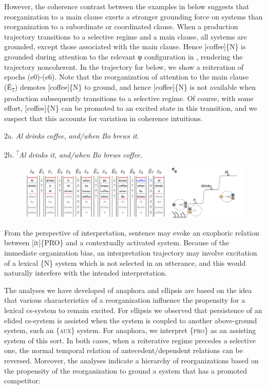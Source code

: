   However, the coherence contrast between the examples in  below suggests that reorganization to a main clause exerts a stronger grounding force on systems than reorganization to a subordinate or coordinated clause. When a production trajectory transitions to a selective regime and a main clause, all systems are grounded, except those associated with the main clause. Hence [coffee]\{N\} is grounded during attention to the relevant φ configuration in , rendering the trajectory noncoherent. In the trajectory for  below, we show a reiteration of epochs (e0)-(e6). Note that the reorganization of attention to the main clause (Ê\textsubscript{7}) demotes [coffee]\{N\} to ground, and hence [coffee]\{N\} is not available when production subsequently transitions to a selective regime. Of course, with some effort, [coffee]\{N\} can be promoted to an excited state in this transition, and we suspect that this accounts for variation in coherence intuitions. 

  2a.  \textit{Al} \textit{drinks} \textit{coffee,} \textit{and/when} \textit{Bo} \textit{brews} \textit{it.}  

  2b.  \textsuperscript{?}\textit{Al} \textit{drinks} \textit{it,} \textit{and/when} \textit{Bo} \textit{brews} \textit{coffee.}

  
\begin{figure}
\includegraphics[width=\textwidth]{figures/Tilsen-img155.png}
\caption{\missingcaption}
\label{fig:}
\end{figure}
 

  From the perspective of interpretation, sentence  may evoke an exophoric relation between [it]\{PRO\} and a contextually activated system. Because of the immediate organization bias, an interpretation trajectory may involve excitation of a lexical \{N\} system which is not selected in an utterance, and this would naturally interfere with the intended interpretation. 

  The analyses we have developed of anaphora and ellipsis are based on the idea that various characteristics of a reorganization influence the propensity for a lexical cs-system to remain excited. For ellipsis we observed that persistence of an elided cs-system is assisted when the system is coupled to another above-ground system, such an \{\textsc{aux}\} system. For anaphora, we interpret \{\textsc{pro}\} as an assisting system of this sort. In both cases, when a reiterative regime precedes a selective one, the normal temporal relation of antecedent/dependent relations can be reversed. Moreover, the analyses indicate a hierarchy of reorganizations based on the propensity of the reorganization to ground a system that has a promoted competitor:

